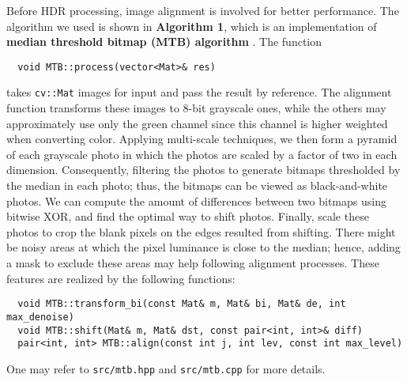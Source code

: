 Before HDR processing, image alignment is involved for better performance. The algorithm we used is shown in \textbf{Algorithm 1}, which is an implementation of \textbf{median threshold bitmap (MTB) algorithm} \cite{ref:Ward}. The function 

\begin{lstlisting}
  void MTB::process(vector<Mat>& res)
\end{lstlisting}

takes \texttt{cv::Mat} images for input and pass the result by reference. The alignment function transforms these images to 8-bit grayscale ones, while the others may approximately use only the green channel since this channel is higher weighted when converting color. Applying multi-scale techniques, we then form a pyramid of each grayscale photo in which the photos are scaled by a factor of two in each dimension. Consequently, filtering the photos to generate bitmaps thresholded by the median in each photo; thus, the bitmaps can be viewed as black-and-white photos. We can compute the amount of differences between two bitmaps using bitwise XOR, and find the optimal way to shift photos. Finally, scale these photos to crop the blank pixels on the edges resulted from shifting. There might be noisy areas at which the pixel luminance is close to the median; hence, adding a mask to exclude these areas may help following alignment processes. These features are realized by the following functions:

\begin{lstlisting}
  void MTB::transform_bi(const Mat& m, Mat& bi, Mat& de, int max_denoise)
  void MTB::shift(Mat& m, Mat& dst, const pair<int, int>& diff)
  pair<int, int> MTB::align(const int j, int lev, const int max_level)
\end{lstlisting}

One may refer to \texttt{src/mtb.hpp} and \texttt{src/mtb.cpp} for more details. 

